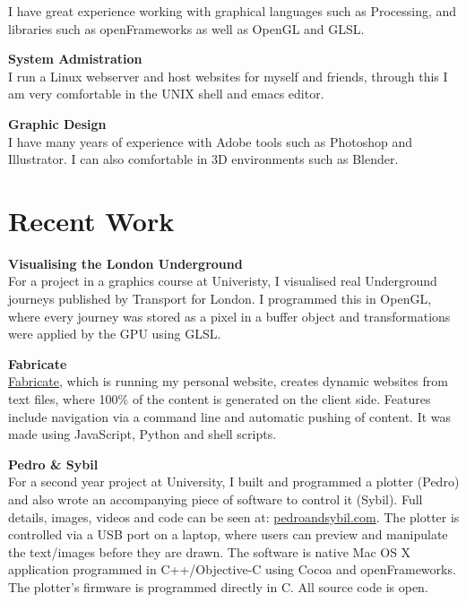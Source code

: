 \documentclass[margin,line,a4paper]{resume}
\begin{document}
\begin{resume}
I have great experience working with graphical languages such as Processing, and libraries such as openFrameworks as well as OpenGL and GLSL.

\textbf{System Admistration} \vspace{1mm} \\
I run a Linux webserver and host websites for myself and friends, through this I am very comfortable in the UNIX shell and emacs editor.

\textbf{Graphic Design} \vspace{1mm} \\
I have many years of experience with Adobe tools such as Photoshop and Illustrator. I can also comfortable in 3D environments such as Blender.

\section{\mysidestyle Recent Work}

\textbf{Visualising the London Underground} \vspace{1mm} \\
For a project in a graphics course at Univeristy, I visualised real Underground journeys published by Transport for London. I programmed this in OpenGL, where every journey was stored as a pixel in a buffer object and transformations were applied by the GPU using GLSL.

\textbf{Fabricate} \vspace{1mm} \\
\href{https://github.com/whg/fabricate}{Fabricate}, which is running my personal website, creates dynamic websites from text files, where 100\% of the content is generated on the client side. Features include navigation via a command line and automatic pushing of content. It was made using JavaScript, Python and shell scripts.

\textbf{Pedro \& Sybil} \vspace{1mm} \\
For a second year project at University, I built and programmed a plotter (Pedro) and also wrote an accompanying piece of software to control it (Sybil). Full details, images, videos and code can be seen at: \href{http://pedroandsybil.com}{pedroandsybil.com}. The plotter is controlled via a USB port on a laptop, where users can preview and manipulate the text/images before they are drawn.  The software is native Mac OS X application programmed in C++/Objective-C using Cocoa and openFrameworks. The plotter’s firmware is programmed directly in C. All source code is open.


\end{resume}
\end{document}
